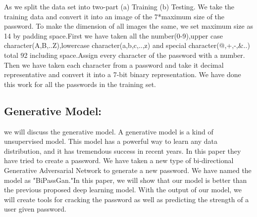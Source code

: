 \documentclass[runningheads]{llncs}
\begin{document}
{As we split the data set into two-part (a) Training (b) Testing. We take the training data and convert it into an image of the 7*maximum size of the password. To make the dimension of all images the same, we set maximum size as 14 by padding space.First we have taken all the number(0-9),upper case character(A,B,..Z),lowercase character(a,b,c,..,z) and special character(@,+,-,&..) total 92 including space.Assign every character of the password with a number. Then we have taken each character from a password and take it decimal representative and convert it into a 7-bit binary representation. We have done this work for all the passwords in the training set.

\par
\newline
\begin{table}[h]
\centering
\caption{Representing text into binary }
\label{}
\end{table}
}
 \subsection{Generative Model:}
 we will discuss the generative model. A generative model is a kind of unsupervised model. This model has a powerful way to learn any data distribution, and it has tremendous success in recent years. In this paper \cite{goodfellow2014generative} they have tried to create a password. We have taken a new type of bi-directional Generative Adversarial Network to generate a new password. We have named the model as "BiPassGan."In this paper, we will show that our model is better than the previous proposed deep learning model. With the output of our model, we will create tools for cracking the password as well as predicting the strength of a user given password.
\end{document}
